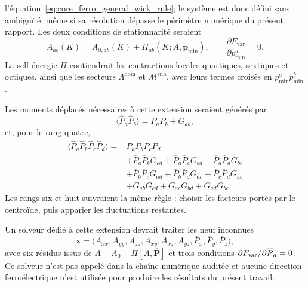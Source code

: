 l'équation~\eqref{eq:core_ferro_general_wick_rule}; le système est donc défini sans
ambiguïté, même si sa résolution dépasse le périmètre numérique du présent
rapport.
Les deux conditions de stationnarité seraient
\begin{equation}
A_{ab}(K)=A_{0,ab}(K)
+\Pi_{ab}(K;A,\mathbf p_{\min}),
\qquad
\frac{\partial F_{\mathrm{var}}}
{\partial p_{\min}^{a}}=0.
\label{eq:core_ferro_stationarity}
\end{equation}
La self-énergie $\Pi$ contiendrait les contractions locales quartiques,
sextiques et octiques, ainsi que les secteurs $\Lambda^{\mathrm{hom}}$ et
$\mathcal M^{\mathrm{inh}}$, avec leurs termes croisés en
$p_{\min}^{a}p_{\min}^{b}$.

Les moments déplacés nécessaires à cette extension seraient générés par
\begin{equation}
\langle\widehat P_a\widehat P_b\rangle
=\overline P_a\overline P_b+G_{ab},
\label{eq:core_shifted_second_moment}
\end{equation}
et, pour le rang quatre,
\begin{equation}
\begin{aligned}
\langle\widehat P_a\widehat P_b\widehat P_c\widehat P_d\rangle
={}&\overline P_a\overline P_b\overline P_c\overline P_d\\
&+\overline P_a\overline P_bG_{cd}
+\overline P_a\overline P_cG_{bd}
+\overline P_a\overline P_dG_{bc}\\
&+\overline P_b\overline P_cG_{ad}
+\overline P_b\overline P_dG_{ac}
+\overline P_c\overline P_dG_{ab}\\
&+G_{ab}G_{cd}+G_{ac}G_{bd}+G_{ad}G_{bc}.
\end{aligned}
\label{eq:core_shifted_fourth_moment}
\end{equation}
Les rangs six et huit suivraient la même règle : choisir les facteurs portés
par le centroïde, puis apparier les fluctuations restantes.

Un solveur dédié à cette extension devrait traiter les neuf inconnues
\begin{equation}
\mathbf x=
\big(A_{xx},A_{yy},A_{zz},A_{xy},A_{xz},A_{yz},
\overline P_x,\overline P_y,\overline P_z\big),
\label{eq:core_ferro_unknown_vector}
\end{equation}
avec six résidus issus de $A-A_0-\Pi[A,\overline{\mathbf P}]$ et trois
conditions $\partial F_{\rm var}/\partial\overline P_a=0$. Ce solveur n'est pas
appelé dans la chaîne numérique auditée et aucune direction ferroélectrique
n'est utilisée pour produire les résultats du présent travail.
